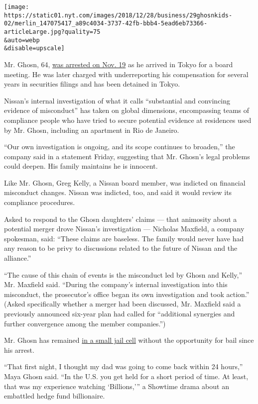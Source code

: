 \texttt{[image: https://static01.nyt.com/images/2018/12/28/business/29ghosnkids-02/merlin\_147075417\_a89c4034-3737-42fb-bbb4-5ead6eb73366-articleLarge.jpg?quality=75\\\&auto=webp\\\&disable=upscale]}

Mr. Ghosn, 64,
\href{https://www.cnbc.com/2018/11/19/renault-and-nissan-carlos-ghosn-to-be-arrested-for-financial-violations.html}{was
arrested on Nov. 19} as he arrived in Tokyo for a board meeting. He was
later charged with underreporting his compensation for several years in
securities filings and has been detained in Tokyo.

Nissan's internal investigation of what it calls ``substantial and
convincing evidence of misconduct'' has taken on global dimensions,
encompassing teams of compliance people who have tried to secure
potential evidence at residences used by Mr. Ghosn, including an
apartment in Rio de Janeiro.

``Our own investigation is ongoing, and its scope continues to
broaden,'' the company said in a statement Friday, suggesting that Mr.
Ghosn's legal problems could deepen. His family maintains he is
innocent.

Like Mr. Ghosn, Greg Kelly, a Nissan board member, was indicted on
financial misconduct changes. Nissan was indicted, too, and said it
would review its compliance procedures.

Asked to respond to the Ghosn daughters' claims --- that animosity about
a potential merger drove Nissan's investigation --- Nicholas Maxfield, a
company spokesman, said: ``These claims are baseless. The family would
never have had any reason to be privy to discussions related to the
future of Nissan and the alliance.''

``The cause of this chain of events is the misconduct led by Ghosn and
Kelly,'' Mr. Maxfield said. ``During the company's internal
investigation into this misconduct, the prosecutor's office began its
own investigation and took action.'' (Asked specifically whether a
merger had been discussed, Mr. Maxfield said a previously announced
six-year plan had called for ``additional synergies and further
convergence among the member companies.'')

Mr. Ghosn has remained
\href{https://www.nytimes.com/2018/12/19/business/carlos-ghosn-jail.html}{in
a small jail cell} without the opportunity for bail since his arrest.

``That first night, I thought my dad was going to come back within 24
hours,'' Maya Ghosn said. ``In the U.S. you get held for a short period
of time. At least, that was my experience watching `Billions,''' a
Showtime drama about an embattled hedge fund billionaire.

